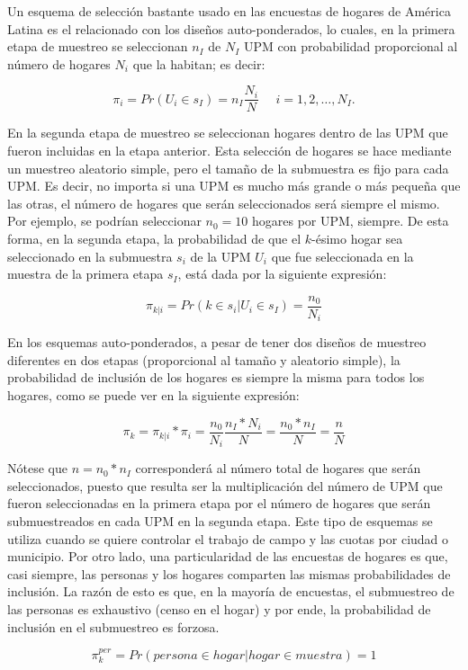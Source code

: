 \documentclass[
  12pt,
]{book}
\begin{document}
Un esquema de selección bastante usado en las encuestas de hogares de América Latina es el relacionado con los diseños auto-ponderados, lo cuales, en la primera etapa de muestreo se seleccionan \(n_I\) de \(N_I\) UPM con probabilidad proporcional al número de hogares \(N_i\) que la habitan; es decir:

\[
\pi_i = Pr(U_i \in s_I) = n_I \frac{N_i}{N} \ \ \ \ \ \ i = 1, 2, \ldots, N_I.
\]

En la segunda etapa de muestreo se seleccionan hogares dentro de las UPM que fueron incluidas en la etapa anterior. Esta selección de hogares se hace mediante un muestreo aleatorio simple, pero el tamaño de la submuestra es fijo para cada UPM. Es decir, no importa si una UPM es mucho más grande o más pequeña que las otras, el número de hogares que serán seleccionados será siempre el mismo. Por ejemplo, se podrían seleccionar \(n_0 = 10\) hogares por UPM, siempre. De esta forma, en la segunda etapa, la probabilidad de que el \(k\)-ésimo hogar sea seleccionado en la submuestra \(s_i\) de la UPM \(U_i\) que fue seleccionada en la muestra de la primera etapa \(s_I\), está dada por la siguiente expresión:

\[
\pi_{k|i} = Pr(k \in s_i | U_i \in s_I ) = \frac{n_0}{N_i}
\]

En los esquemas auto-ponderados, a pesar de tener dos diseños de muestreo diferentes en dos etapas (proporcional al tamaño y aleatorio simple), la probabilidad de inclusión de los hogares es siempre la misma para todos los hogares, como se puede ver en la siguiente expresión:

\[\pi_k = \pi_{k|i} * \pi_i = \frac{n_0}{N_i} \frac{n_I* N_i}{N} = \frac{n_0*n_I}{N} = \frac{n}{N}\]

Nótese que \(n = n_0 * n_I\) corresponderá al número total de hogares que serán seleccionados, puesto que resulta ser la multiplicación del número de UPM que fueron seleccionadas en la primera etapa por el número de hogares que serán submuestreados en cada UPM en la segunda etapa. Este tipo de esquemas se utiliza cuando se quiere controlar el trabajo de campo y las cuotas por ciudad o municipio. Por otro lado, una particularidad de las encuestas de hogares es que, casi siempre, las personas y los hogares comparten las mismas probabilidades de inclusión. La razón de esto es que, en la mayoría de encuestas, el submuestreo de las personas es exhaustivo (censo en el hogar) y por ende, la probabilidad de inclusión en el submuestreo es forzosa.

\[
\pi_k^{per} = Pr(persona \in hogar | hogar \in muestra) =  1
\]
\end{document}
